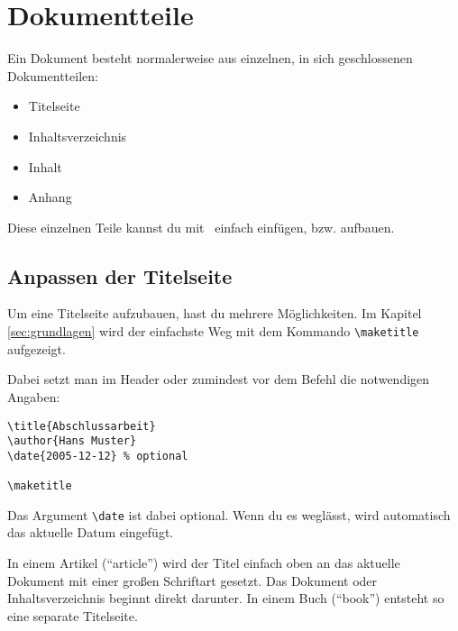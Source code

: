 %
%

\chapter{Dokumentteile}

Ein Dokument besteht normalerweise aus einzelnen, in sich geschlossenen Dokumentteilen:

\begin{itemize}
	\item Titelseite
	\item Inhaltsverzeichnis
	\item Inhalt
	\item Anhang
\end{itemize}

Diese einzelnen Teile kannst du mit \DMLLaTeX \ einfach einfügen, bzw. aufbauen.

\section{Anpassen der Titelseite}

Um eine Titelseite aufzubauen, hast du mehrere Möglichkeiten. Im Kapitel \ref{sec:grundlagen} wird der einfachste Weg mit dem Kommando \texttt{\textbackslash maketitle} aufgezeigt.

Dabei setzt man im Header oder zumindest vor dem Befehl die notwendigen Angaben:

\begin{lstlisting}
\title{Abschlussarbeit}
\author{Hans Muster}
\date{2005-12-12} % optional

\maketitle
\end{lstlisting}

Das Argument \texttt{\textbackslash date} ist dabei optional. Wenn du es weglässt, wird automatisch das aktuelle Datum eingefügt. 

In einem Artikel (\enquote{article}) wird der Titel einfach oben an das aktuelle Dokument mit einer großen Schriftart gesetzt. Das Dokument oder Inhaltsverzeichnis beginnt direkt darunter. In einem Buch (\enquote{book}) entsteht so eine separate Titelseite.

